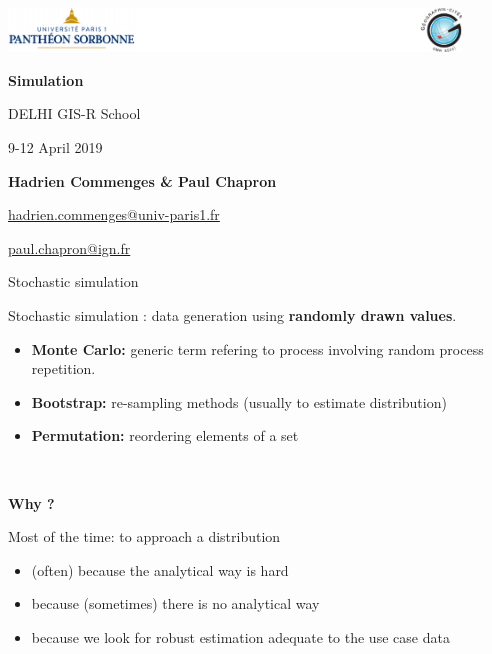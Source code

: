 \graphicspath{{IMAGE/}}

\begin{frame}

\includegraphics[width=12cm]{Logos.pdf}

\vfill

\begin{center}

\vspace*{1.5cm}

\LARGE
\textbf{Simulation}

\vspace*{1.5cm}
 DELHI GIS-R School


\large
9-12 April 2019

\vspace*{1.5cm}


\textbf{Hadrien Commenges \& Paul Chapron}

{\small

\vspace*{0.1cm}

\url{hadrien.commenges@univ-paris1.fr}

\url{paul.chapron@ign.fr}

}

\end{center}

\end{frame}

\begin{frame}{Stochastic simulation }

Stochastic simulation : data generation using \textbf{randomly drawn values}.

\begin{itemize}
\item \textbf{Monte Carlo:} generic term refering to process involving random process repetition.
\item \textbf{Bootstrap:} re-sampling methods (usually to estimate distribution) 
\item \textbf{Permutation:} reordering elements of a set   
\end{itemize}

~

\textbf{Why ? }

Most of the time:  to approach a distribution 

\begin{itemize}
\item (often) because the analytical way is hard 
\item because (sometimes) there is no analytical way 
\item because we look for robust estimation adequate to the use case data 
\end{itemize}

\end{frame}


